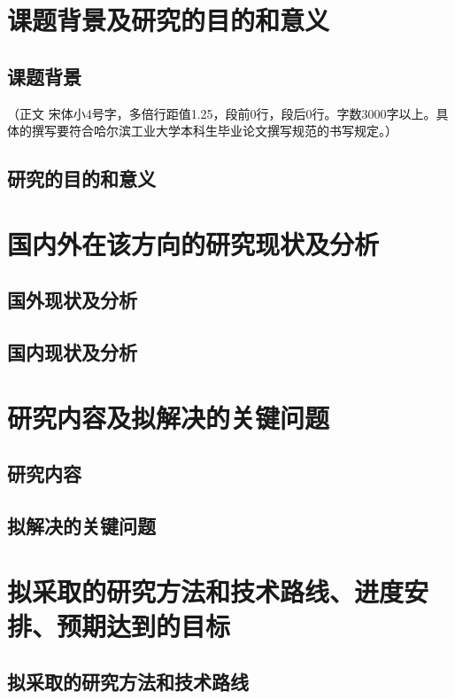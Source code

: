 \documentclass[fontset=windows,toc=true,type=bachelor,stage=opening,campus=weihai]{hithesisart}
\begin{document}

\makecover

\section{课题背景及研究的目的和意义}
\subsection{课题背景}
（正文  宋体小4号字，多倍行距值1.25，段前0行，段后0行。字数3000字以上。具体的撰写要符合哈尔滨工业大学本科生毕业论文撰写规范的书写规定。）\cite{hithesis2017}
\subsection{研究的目的和意义}
\section{国内外在该方向的研究现状及分析}
\subsection{国外现状及分析}
\subsection{国内现状及分析}
\section{研究内容及拟解决的关键问题}
\subsection{研究内容}
\subsection{拟解决的关键问题}
\section{拟采取的研究方法和技术路线、进度安排、预期达到的目标}
\subsection{拟采取的研究方法和技术路线}
\end{document}
